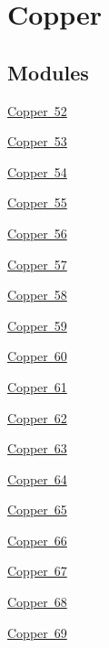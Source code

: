 \hypertarget{group___isotope_const-_copper}{}\section{Copper}
\label{group___isotope_const-_copper}
\subsection*{Modules}
\begin{DoxyCompactItemize}
\item 
\mbox{\hyperlink{group___isotope_const-_copper-_cu52}{Copper 52}}
\item 
\mbox{\hyperlink{group___isotope_const-_copper-_cu53}{Copper 53}}
\item 
\mbox{\hyperlink{group___isotope_const-_copper-_cu54}{Copper 54}}
\item 
\mbox{\hyperlink{group___isotope_const-_copper-_cu55}{Copper 55}}
\item 
\mbox{\hyperlink{group___isotope_const-_copper-_cu56}{Copper 56}}
\item 
\mbox{\hyperlink{group___isotope_const-_copper-_cu57}{Copper 57}}
\item 
\mbox{\hyperlink{group___isotope_const-_copper-_cu58}{Copper 58}}
\item 
\mbox{\hyperlink{group___isotope_const-_copper-_cu59}{Copper 59}}
\item 
\mbox{\hyperlink{group___isotope_const-_copper-_cu60}{Copper 60}}
\item 
\mbox{\hyperlink{group___isotope_const-_copper-_cu61}{Copper 61}}
\item 
\mbox{\hyperlink{group___isotope_const-_copper-_cu62}{Copper 62}}
\item 
\mbox{\hyperlink{group___isotope_const-_copper-_cu63}{Copper 63}}
\item 
\mbox{\hyperlink{group___isotope_const-_copper-_cu64}{Copper 64}}
\item 
\mbox{\hyperlink{group___isotope_const-_copper-_cu65}{Copper 65}}
\item 
\mbox{\hyperlink{group___isotope_const-_copper-_cu66}{Copper 66}}
\item 
\mbox{\hyperlink{group___isotope_const-_copper-_cu67}{Copper 67}}
\item 
\mbox{\hyperlink{group___isotope_const-_copper-_cu68}{Copper 68}}
\item 
\mbox{\hyperlink{group___isotope_const-_copper-_cu69}{Copper 69}}
\item 

\end{DoxyCompactItemize}
